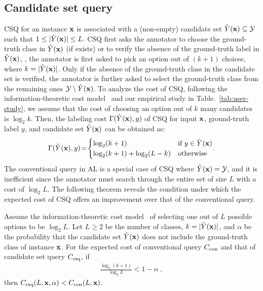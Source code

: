 \subsection{Candidate set query}
\label{sec:candidate_set_query}
CSQ for an instance $\mathbf{x}$ is associated with a (non-empty) candidate set $\hat{Y}(\mathbf{x}) \subseteq \mathcal{Y}$ such that $1 \leq |\hat{Y}(\mathbf{x})| \leq L$.
CSQ first asks the annotator to choose the ground-truth class in $\hat{Y}(\mathbf{x})$ (if exists) or to verify the absence of the ground-truth label in $\hat{Y}(\mathbf{x})$,
\ie, the annotator is first asked to pick an option out of $(k+1)$ choices, where $k=|\hat{Y}(\mathbf{x})|$.
Only if the absence of the ground-truth class in the candidate set is verified, the annotator is further asked to select the ground-truth class from the remaining ones $\mathcal{Y} \setminus \hat{Y}(\mathbf{x})$.
To analyze the cost of CSQ, following the information-theoretic cost model~\citep{hu2020one} and our empirical study in Table.~\ref{tab:user-study}, we assume that the cost of choosing an option out of $k$ many candidates is $\log_2 k$.
Then, the labeling cost $\Gamma(\hat{Y}(\mathbf{x}), y)$ of CSQ for input $\mathbf{x}$, ground-truth label $y$, and candidate set $\hat{Y}(\mathbf{x})$ can be obtained as:
\begin{equation}
        \Gamma(\hat{Y}(\mathbf{x}), y) \!=\!
        \begin{cases}
            \log_2 (k + 1) & \text{if } y \in \hat{Y}(\mathbf{x}) \\
            \log_2 (k + 1) + \log_2 (L-k) & \text{otherwise}
        \end{cases} \!.
        \label{eq:cost}
\end{equation}
The conventional query in AL is a special case of CSQ where $\hat{Y}(\mathbf{x}) = \mathcal{Y}$, and it is inefficient since the annotator must search through the entire set of size $L$ with a cost of $\log_2 L$.
The following theorem reveals the condition under which the expected cost of CSQ offers an improvement over that of the conventional query.
\begin{theorem}
    \label{theorem_1}
    Assume the information-theoretic cost model~\citep{hu2020one} of selecting one out of $L$ possible options to be $\log_2 L$. 
    Let $L \ge 2$ be the number of classes, $k = |\hat{Y}(\mathbf{x})|$, and $\alpha$ be the probability that the candidate set $\hat Y(\mathbf{x})$ does not include the ground-truth class of instance $\mathbf{x}$.
    For the expected cost of conventional query $C_{\textnormal{con}}$ and that of candidate set query $C_{\textnormal{csq}}$,
    if
    \begin{align}
        \frac{\log_2 (k+1)}{\log_2 L} < 1 - \alpha \;,        
        \label{eq:theorem}
    \end{align}
    then $C_{\textnormal{csq}} (L, \mathbf{x}, \alpha) < C_{\textnormal{con}}(L,\mathbf{x})$.
\end{theorem}
